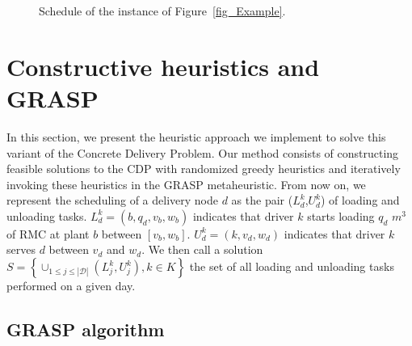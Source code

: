 \documentclass{article}
\begin{document}
\begin{figure}[htbp]
\begin{adjustbox}{max width=0.85\textwidth}
    \end{adjustbox}
    \caption{Schedule of the instance of Figure~\ref{fig_Example}.}
    \label{fig:ganttExample}
\end{figure}


\section{Constructive heuristics and GRASP}
\label{grasp_method}

In this section, we present the heuristic approach we implement to solve this variant of the Concrete Delivery Problem. Our method consists of constructing feasible solutions to the CDP with randomized greedy heuristics and iteratively invoking these heuristics in the GRASP metaheuristic. From now on, we represent the scheduling of a delivery node $d$ as the pair  ($L^k_{d}$,$U^k_{d}$) of loading and unloading tasks. $L^k_{d} = \left(b,q_d,v_b,w_b\right)$ indicates that driver $k$ starts loading $q_d$ $m^3$ of RMC at plant $b$ between $\left[v_b,w_b\right]$. $U^k_{d} = \left(k,v_d, w_d\right)$ indicates that driver $k$ serves $d$ between $v_d$ and $w_d$. We then call a solution $ S =\left\lbrace \cup _{1 \leq j \leq |\mathcal{D}|} (L^k_{j}, U^k_{j}), k \in K \right\rbrace$ the set of all loading and unloading tasks performed on a given day.

\subsection{GRASP algorithm }
\end{document}
